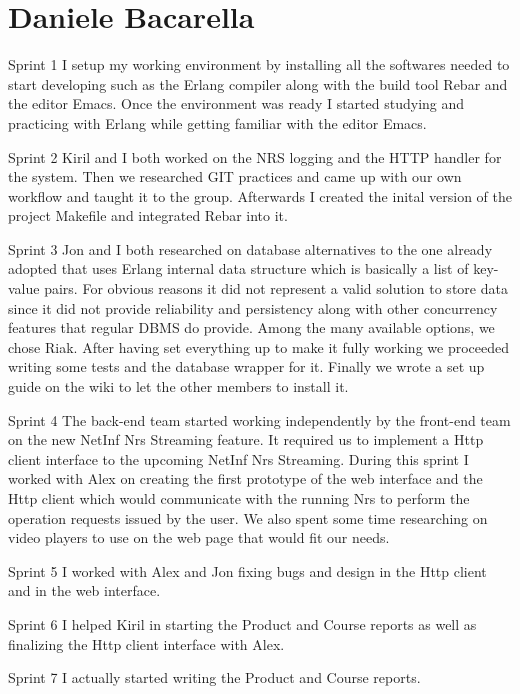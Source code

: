 \section{Daniele Bacarella}

Sprint 1
I setup my working environment by installing all the softwares needed to start developing such as the Erlang compiler along with the build tool Rebar and the editor Emacs.
Once the environment was ready I started studying and practicing with Erlang while getting familiar with the editor Emacs.

Sprint 2
Kiril and I both worked on the NRS logging and the HTTP handler for the system. Then we researched GIT practices and came up with our own workflow and taught it to the group.
Afterwards I created the inital version of the project Makefile and integrated Rebar into it.

Sprint 3
Jon and I both researched on database alternatives to the one already adopted that uses Erlang internal data structure which is basically a list of key-value pairs. For obvious reasons it did not represent a valid solution to store data since it did not provide reliability and persistency along with other concurrency features that regular DBMS do provide.
Among the many available options, we chose Riak.
After having set everything up to make it fully working we proceeded writing some tests and the database wrapper for it.
Finally we wrote a set up guide on the wiki to let the other members to install it. 

Sprint 4
The back-end team started working independently by the front-end team on the new NetInf Nrs Streaming feature.
It required us to implement a Http client interface to the upcoming NetInf Nrs Streaming.
During this sprint I worked with Alex on creating the first prototype of the web interface and the Http client which would communicate with the running Nrs to perform the operation requests issued by the user.
We also spent some time researching on video players to use on the web page that would fit our needs.

Sprint 5
I worked with Alex and Jon fixing bugs and design in the Http client and in the web interface.

Sprint 6
I helped Kiril in starting the Product and Course reports as well as finalizing the Http client interface with Alex.

Sprint 7
I actually started writing the Product and Course reports.